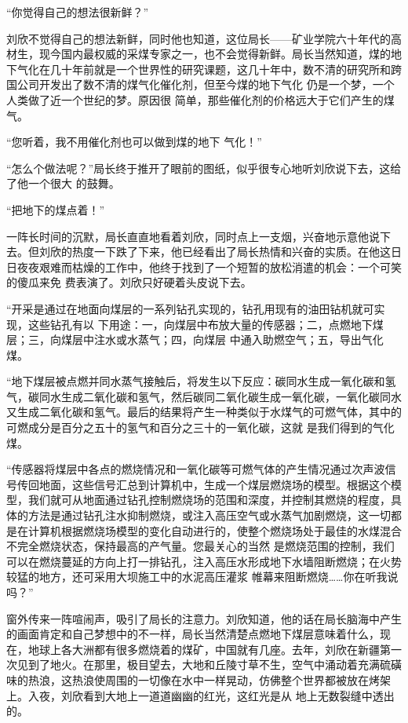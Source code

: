 \documentclass{article}
\begin{document}
“你觉得自己的想法很新鲜？” 

刘欣不觉得自己的想法新鲜，同时他也知道，这位局长——矿业学院六十年代的高材生，现今国内最权威的采煤专家之一，也不会觉得新鲜。局长当然知道，煤的地下气化在几十年前就是一个世界性的研究课题，这几十年中，数不清的研究所和跨国公司开发出了数不清的煤气化催化剂，但至今煤的地下气化
\newpage
仍是一个梦，一个人类做了近一个世纪的梦。原因很
简单，那些催化剂的价格远大于它们产生的煤气。 

“您听着，我不用催化剂也可以做到煤的地下
气化！” 

“怎么个做法呢？”局长终于推开了眼前的图纸，似乎很专心地听刘欣说下去，这给了他一个很大
的鼓舞。 


“把地下的煤点着！” 

一阵长时间的沉默，局长直直地看着刘欣，同时点上一支烟，兴奋地示意他说下去。但刘欣的热度一下跌了下来，他已经看出了局长热情和兴奋的实质。在他这日日夜夜艰难而枯燥的工作中，他终于找到了一个短暂的放松消遣的机会：一个可笑的傻瓜来免
费表演了。刘欣只好硬着头皮说下去。 

“开采是通过在地面向煤层的一系列钻孔实现的，钻孔用现有的油田钻机就可实现，这些钻孔有以
\newpage
下用途：一，向煤层中布放大量的传感器；二，点燃地下煤层；三，向煤层中注水或水蒸气；四，向煤层
中通入助燃空气；五，导出气化煤。 

“地下煤层被点燃并同水蒸气接触后，将发生以下反应：碳同水生成一氧化碳和氢气，碳同水生成二氧化碳和氢气，然后碳同二氧化碳生成一氧化碳，一氧化碳同水又生成二氧化碳和氢气。最后的结果将产生一种类似于水煤气的可燃气体，其中的可燃成分是百分之五十的氢气和百分之三十的一氧化碳，这就
是我们得到的气化煤。 

“传感器将煤层中各点的燃烧情况和一氧化碳等可燃气体的产生情况通过次声波信号传回地面，这些信号汇总到计算机中，生成一个煤层燃烧场的模型。根据这个模型，我们就可从地面通过钻孔控制燃烧场的范围和深度，并控制其燃烧的程度，具体的方法是通过钻孔注水抑制燃烧，或注入高压空气或水蒸气加剧燃烧，这一切都是在计算机根据燃烧场模型的变化自动进行的，使整个燃烧场处于最佳的水煤混合不完全燃烧状态，保持最高的产气量。您最关心的当然
\newpage
是燃烧范围的控制，我们可以在燃烧蔓延的方向上打一排钻孔，注入高压水形成地下水墙阻断燃烧；在火势较猛的地方，还可采用大坝施工中的水泥高压灌浆
帷幕来阻断燃烧……你在听我说吗？” 

窗外传来一阵喧闹声，吸引了局长的注意力。刘欣知道，他的话在局长脑海中产生的画面肯定和自己梦想中的不一样，局长当然清楚点燃地下煤层意味着什么，现在，地球上各大洲都有很多燃烧着的煤矿，中国就有几座。去年，刘欣在新疆第一次见到了地火。在那里，极目望去，大地和丘陵寸草不生，空气中涌动着充满硫磺味的热浪，这热浪使周围的一切像在水中一样晃动，仿佛整个世界都被放在烤架上。入夜，刘欣看到大地上一道道幽幽的红光，这红光是从
地上无数裂缝中透出的。 
\end{document}
